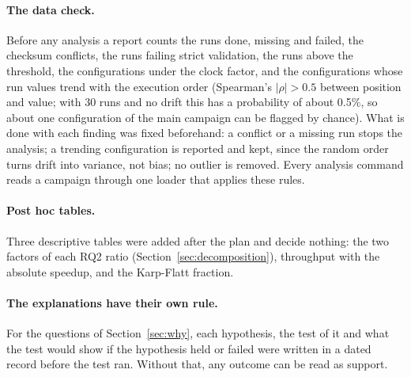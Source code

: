 \paragraph{The data check.} Before any analysis a report counts the runs
done, missing and failed, the checksum conflicts, the runs failing strict
validation, the runs above the threshold, the configurations under the
clock factor, and the configurations whose run values trend with the
execution order (Spearman's $|\rho| > 0.5$ between position and value; with
30 runs and no drift this has a probability of about 0.5\%, so about one
configuration of the main campaign can be flagged by chance). What is done
with each finding was fixed beforehand: a conflict or a missing run stops
the analysis; a trending configuration is reported and kept, since the
random order turns drift into variance, not bias; no outlier is removed.
Every analysis command reads a campaign through one loader that applies
these rules.

\paragraph{Post hoc tables.} Three descriptive tables were added after the
plan and decide nothing: the two factors of each RQ2 ratio
(Section~\ref{sec:decomposition}), throughput with the absolute speedup,
and the Karp-Flatt fraction.

\paragraph{The explanations have their own rule.} For the questions of
Section~\ref{sec:why}, each hypothesis, the test of it and what the test
would show if the hypothesis held or failed were written in a dated record
before the test ran. Without that, any outcome can be read as support.
